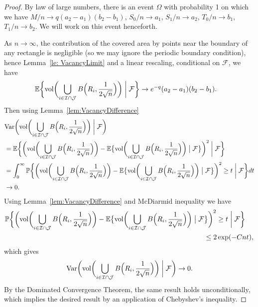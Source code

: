 \documentclass[11pt]{article}
\newcommand{\E}{\mathbb{E}}
\newcommand{\vol}{\mathrm{vol}}
\newcommand{\var}{\mathrm{Var}}
\begin{document}
\begin{proof}
By law of large numbers, there is an event $\Omega$ with probability 1 on which we have $M / n \to q(a_2-a_1)(b_2-b_1)$, $S_0 / n\to a_1$, $S_1/n\to a_2$, $T_0 / n\to b_1$, $T_1/n\to b_2$.  We will work on this event henceforth. 

As $n\to\infty$, the contribution of the covered area by points near the boundary of any rectangle is negligible (so we may ignore the periodic boundary condition), hence Lemma~\ref{le: VacancyLimit} and a linear rescaling, conditional on $\mathcal{F}$, we have 
\begin{align*}
\mathbb{E}\biggl\{\vol\biggl(\bigcup_{i\in\mathcal{I}\cap\mathcal{J}}B\Bigl(R_i, \frac{1}{2\sqrt{n}}\Bigr)\biggr) \biggm | \mathcal{F}\biggr\} &\to e^{-q}(a_2-a_1)(b_2-b_1).
\end{align*}
Then using Lemma~\ref{lem:VacancyDifference}
\begin{align*}
    &\var\biggl(\vol\biggl(\bigcup_{i\in\mathcal{I}\cap\mathcal{J}}B\Bigl(R_i, \frac{1}{2\sqrt{n}}\Bigr)\biggr) \biggm | \mathcal{F}\biggr) \\
    &= \E\biggl\{\bigg(\vol\biggl(\bigcup_{i\in\mathcal{I}\cap\mathcal{J}}B\Bigl(R_i, \frac{1}{2\sqrt{n}}\Bigr)\biggr) - \E\bigl\{\vol\biggl(\bigcup_{i\in\mathcal{I}\cap\mathcal{J}}B\Bigl(R_i, \frac{1}{2\sqrt{n}}\Bigr)\biggr)\bigm | \mathcal{F}\bigr\}\bigg)^2 \biggm | \mathcal{F}\biggr\} \\
    &= \int_0^\infty \mathbb{P}\biggl\{\bigg(\vol\biggl(\bigcup_{i\in\mathcal{I}\cap\mathcal{J}}B\Bigl(R_i, \frac{1}{2\sqrt{n}}\Bigr)\biggr) - \E\bigl\{\vol\biggl(\bigcup_{i\in\mathcal{I}\cap\mathcal{J}}B\Bigl(R_i, \frac{1}{2\sqrt{n}}\Bigr)\biggr)\bigm | \mathcal{F}\bigr\}\bigg)^2 \geq t \biggm | \mathcal{F}\biggr\} dt \\
    &\to 0.
\end{align*}
Using Lemma~\ref{lem:VacancyDifference} and McDiarmid inequality we have
\begin{align*}
\mathbb{P}\biggl\{\bigg(\vol\biggl(\bigcup_{i\in\mathcal{I}\cap\mathcal{J}}B\Bigl(R_i, \frac{1}{2\sqrt{n}}\Bigr)\biggr) - \E\bigl\{\vol\biggl(\bigcup_{i\in\mathcal{I}\cap\mathcal{J}}B\Bigl(R_i, \frac{1}{2\sqrt{n}}\Bigr)\biggr)\bigm | \mathcal{F}&\bigr\}\bigg)^2 \geq t  \biggm | \mathcal{F}\biggr\} \\
&\leq 2\exp(-Cnt),
\end{align*}
which gives
\[
\var\biggl(\vol\biggl(\bigcup_{i\in\mathcal{I}\cap\mathcal{J}}B\Bigl(R_i, \frac{1}{2\sqrt{n}}\Bigr)\biggr) \biggm | \mathcal{F}\biggr)\to 0.
\]
By the Dominated Convergence Theorem, the same result holds unconditionally, which implies the desired result by an application of Chebyshev's inequality.
\end{proof}
\end{document}
